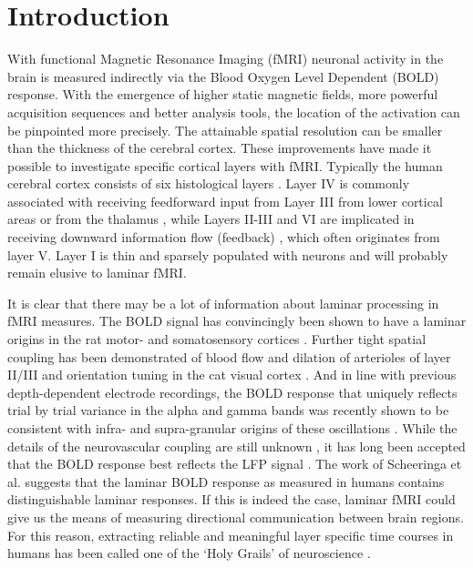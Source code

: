 \section{Introduction}
With functional Magnetic Resonance Imaging (fMRI) neuronal activity in the brain is measured indirectly via the Blood Oxygen Level Dependent (BOLD) response. With the emergence of higher static magnetic fields, more powerful acquisition sequences and better analysis tools, the location of the activation can be pinpointed  more  precisely. The attainable spatial resolution can be smaller than the thickness of the cerebral cortex. These improvements have made it possible to investigate specific cortical layers with fMRI.
Typically the human cerebral cortex consists of six histological layers \cite{Brodmann1909}. Layer IV is commonly associated with receiving feedforward input from Layer III from lower cortical areas or from the thalamus \cite{Jones1998}, while Layers II-III and VI are implicated in receiving downward information flow (feedback) \cite{Alitto2003}, which often originates from layer V. Layer I is thin and sparsely populated with neurons and will probably remain elusive to laminar fMRI. 

It is clear that there may be a lot of information about laminar processing in fMRI measures. The BOLD signal has convincingly been shown to have a laminar origins in the rat motor- and somatosensory cortices \cite{Yu2014}. Further tight spatial coupling has been demonstrated of blood flow and dilation of arterioles of layer II/III and orientation tuning in the cat visual cortex \cite{OHerron2016}. And in line with previous depth-dependent electrode recordings, the BOLD response that uniquely reflects trial by trial variance in the alpha and gamma bands was recently shown to be consistent with infra- and supra-granular origins of these oscillations \cite{Scheeringa2016}. While the details of the neurovascular coupling are still unknown \cite{Uludag2017}, it has long been accepted that the BOLD response best reflects the LFP signal \cite{Logothetis2001,Lauritzen2005}. The work of Scheeringa et al. suggests that the laminar BOLD response as measured in humans \cite[e.g.]{Koopmans2010,Polimeni2010,Maass2014,Kok2016} contains distinguishable laminar responses. If this is indeed the case, laminar fMRI could give us the means of measuring directional communication between brain regions. For this reason, extracting reliable and meaningful layer specific time courses in humans has been called one of the `Holy Grails' of neuroscience \cite{Barazany2012}. 

